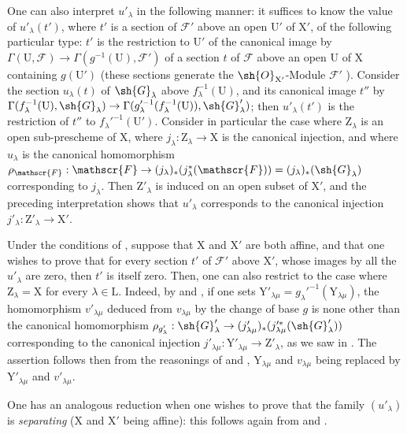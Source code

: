 \begin{env}[11.9.5]
One can also interpret $u'_\lambda$ in the following manner: it suffices to know the value of $u'_\lambda(t')$, where $t'$ is a section of $\mathscr{F}'$ above an open $\mathrm{U}'$ of $\mathrm{X}'$, of the following particular type: $t'$ is the restriction to $\mathrm{U}'$ of the canonical image by $\Gamma(\mathrm{U},\mathscr{F})\to\Gamma(g^{-1}(\mathrm{U}),\mathscr{F}')$ of a section $t$ of $\mathscr{F}$ above an open $\mathrm{U}$ of $\mathrm{X}$ containing $g(\mathrm{U}')$ (these sections generate the $\sh{O}_{\mathrm{X}'}$-Module $\mathscr{F}'$ ).
Consider the section $u_\lambda(t)$ of $\sh{G}_\lambda$ above $f_\lambda^{-1}(\mathrm{U})$, and its canonical image $t''$ by $\Gamma(f_\lambda^{-1}(\mathrm{U}),\sh{G}_\lambda)\to\Gamma(g_\lambda'^{-1}(f_\lambda^{-1}(\mathrm{U})),\sh{G}'_\lambda)$; then $u'_\lambda(t')$ is the restriction of $t''$ to $f_\lambda'^{-1}(\mathrm{U}')$.
Consider in particular the case where $\mathrm{Z}_\lambda$ is an open sub-prescheme of $\mathrm{X}$, where $j_\lambda:\mathrm{Z}_\lambda\to\mathrm{X}$ is the canonical injection, and where $u_\lambda$ is the canonical homomorphism $\rho_\mathscr{F}:\mathscr{F}\to(j_\lambda)_*(j_\lambda^*(\mathscr{F}))=(j_\lambda)_*(\sh{G}_\lambda)$  corresponding to $j_\lambda$.
Then $\mathrm{Z}'_\lambda$ is induced on an open subset of $\mathrm{X}'$, and the preceding interpretation shows that $u'_\lambda$ corresponds to the canonical injection $j'_\lambda:\mathrm{Z}'_\lambda\to\mathrm{X}'$.
\end{env}

\begin{env}[11.9.6]
\label{IV.11.9.6}
Under the conditions of , suppose that $\mathrm{X}$ and $\mathrm{X}'$ are both affine, and that one wishes to prove that for every section $t'$ of $\mathscr{F}'$ above $\mathrm{X}'$, whose images by all the $u'_\lambda$ are zero, then $t'$ is itself zero.
Then, one can also restrict to the case where $\mathrm{Z}_\lambda=\mathrm{X}$ for every $\lambda\in\mathrm{L}$.
Indeed, by  and , if one sets $\mathrm{Y}'_{\lambda\mu}=g_\lambda'^{-1}(\mathrm{Y}_{\lambda\mu})$, the homomorphism $v'_{\lambda\mu}$ deduced from $v_{\lambda\mu}$ by the change of base $g$ is none other than the canonical homomorphism
$\rho_{g'_\lambda}:\sh{G}'_\lambda\to(j'_{\lambda\mu})_*(j_{\lambda\mu}'^*(\sh{G}'_\lambda))$ corresponding to the canonical injection $j'_{\lambda\mu}:\mathrm{Y}'_{\lambda\mu}\to\mathrm{Z}'_\lambda$, as we saw in .
The assertion follows then from the reasonings of  and , $\mathrm{Y}_{\lambda\mu}$ and $v_{\lambda\mu}$ being replaced by $\mathrm{Y}'_{\lambda\mu}$ and $v'_{\lambda\mu}$.

One has an analogous reduction when one wishes to prove that the family $(u'_\lambda)$ is \emph{separating} ($\mathrm{X}$ and $\mathrm{X}'$ being affine): this follows again from  and .
\end{env}

